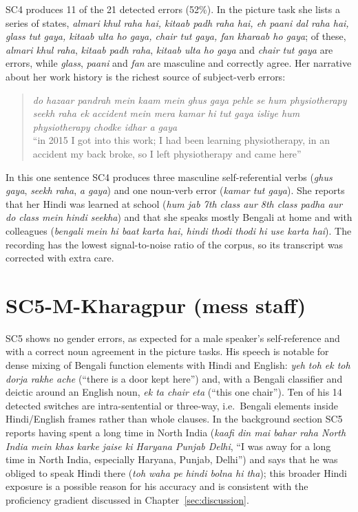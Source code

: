 \documentclass[11pt,a4paper]{report}
\begin{document}
SC4 produces 11 of the 21 detected errors (52\%). In the picture task she lists a series of states, \textit{almari khul raha hai, kitaab padh raha hai, eh paani dal raha hai, glass tut gaya, kitaab ulta ho gaya, chair tut gaya, fan kharaab ho gaya}; of these, \textit{almari khul raha}, \textit{kitaab padh raha}, \textit{kitaab ulta ho gaya} and \textit{chair tut gaya} are errors, while \textit{glass}, \textit{paani} and \textit{fan} are masculine and correctly agree. Her narrative about her work history is the richest source of subject-verb errors:
\begin{quote}
  \textit{do hazaar pandrah mein kaam mein ghus gaya pehle se hum physiotherapy seekh raha ek accident mein mera kamar hi tut gaya isliye hum physiotherapy chodke idhar a gaya}\\
  ``in 2015 I got into this work; I had been learning physiotherapy, in an accident my back broke, so I left physiotherapy and came here''
\end{quote}
In this one sentence SC4 produces three masculine self-referential verbs (\textit{ghus gaya}, \textit{seekh raha}, \textit{a gaya}) and one noun-verb error (\textit{kamar tut gaya}). She reports that her Hindi was learned at school (\textit{hum jab 7th class aur 8th class padha aur do class mein hindi seekha}) and that she speaks mostly Bengali at home and with colleagues (\textit{bengali mein hi baat karta hai, hindi thodi thodi hi use karta hai}). The recording has the lowest signal-to-noise ratio of the corpus, so its transcript was corrected with extra care.

\section{SC5-M-Kharagpur (mess staff)}

SC5 shows no gender errors, as expected for a male speaker's self-reference and with a correct noun agreement in the picture tasks. His speech is notable for dense mixing of Bengali function elements with Hindi and English: \textit{yeh toh ek toh dorja rakhe ache} (``there is a door kept here'') and, with a Bengali classifier and deictic around an English noun, \textit{ek ta chair eta} (``this one chair''). Ten of his 14 detected switches are intra-sentential or three-way, i.e.\ Bengali elements inside Hindi/English frames rather than whole clauses. In the background section SC5 reports having spent a long time in North India (\textit{kaafi din mai bahar raha North India mein khas karke jaise ki Haryana Punjab Delhi}, ``I was away for a long time in North India, especially Haryana, Punjab, Delhi'') and says that he was obliged to speak Hindi there (\textit{toh waha pe hindi bolna hi tha}); this broader Hindi exposure is a possible reason for his accuracy and is consistent with the proficiency gradient discussed in Chapter~\ref{sec:discussion}.
\end{document}
